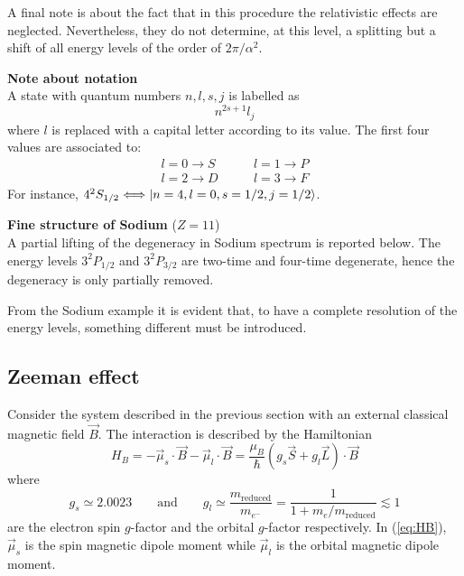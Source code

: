 A final note is about the fact that in this procedure the relativistic effects are neglected. Nevertheless, they do not determine, at this level, a splitting but a shift of all energy levels of the order of $2\pi/\alpha^2$. 


\begin{tcolorbox} 
\textbf{Note about notation}\\ 
A state with quantum numbers $n, l, s, j$ is labelled as $$n^{2s+1}l_j$$
where $l$ is replaced with a capital letter according to its value. The first four values are associated to: 
\begin{align*}
l=0 \rightarrow S \qquad & l=1 \rightarrow P\\
l=2 \rightarrow D \qquad & l=3 \rightarrow F 
\end{align*}
For instance, $4^2S_{1/2}  \Longleftrightarrow \ket{n=4,l=0,s=1/2,j=1/2}$.
\end{tcolorbox}

\begin{tcolorbox} 
\textbf{Fine structure of Sodium} ($Z=11$) \\
A partial lifting of the degeneracy in Sodium spectrum is reported below. The energy levels $3^2 P_{1/2}$ and $3^2 P_{3/2}$ are two-time and four-time degenerate, hence the degeneracy is only partially removed. 
\begin{center}

\end{center}
\end{tcolorbox}

From the Sodium example it is evident that, to have a complete resolution of the energy levels, something different must be introduced. 

\subsection{Zeeman effect}

Consider the system described in the previous section with an external classical magnetic field $\vec{B}$. The interaction is described by the Hamiltonian
\begin{equation*}
H_B = -\vec{\mu}_s\cdot \vec{B} -\vec{\mu}_l\cdot \vec{B} = \frac{\mu_B}{\hbar} \left( g_s \vec{S} + g_l \vec{L}\right) \cdot \vec{B}
\label{eq:HB}
\end{equation*}
where
\begin{equation*}
g_s \simeq 2.0023 \qquad \text{and} \qquad g_l \simeq \frac{m_{\textrm{reduced}}}{m_{e^-}} = \frac{1}{1 + m_e/m_\text{reduced}}\lesssim 1
\end{equation*}
are the electron spin $g$-factor and the orbital $g$-factor respectively. 
In (\ref{eq:HB}), $\vec{\mu}_s$ is the spin magnetic dipole moment while $\vec{\mu}_l$ is the orbital magnetic dipole moment. 

